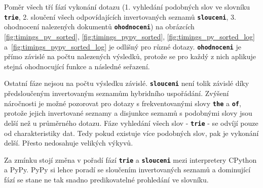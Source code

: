 \documentclass[11pt,letterpaper,oneside,openright]{book}
\newcommand{\bftt}[1]{\texttt{\textbf{#1}}}
\begin{document}
Poměr všech tří fází vykonání dotazu (1. vyhledání podobných slov ve slovníku
\bftt{trie}, 2. sloučení všech odpovídajících invertovaných seznamů
\bftt{slouceni}, 3. ohodnocení nalezených dokumentů \bftt{ohodnoceni}) na
obrázcích \ref{fig:timings_py_sorted}, \ref{fig:timings_pypy_sorted},
\ref{fig:timings_py_sorted_log} a~\ref{fig:timings_pypy_sorted_log} je odlišný
pro různé dotazy. \bftt{ohodnoceni} je přímo závislé na počtu nalezených
výsledků, protože se pro každý z nich aplikuje stejná ohodnocující funkce a
následné seřazení.

Ostatní fáze nejsou na počtu výsledku závislé. \bftt{slouceni} není tolik
závislé díky předsloučeným invertovaným seznamům hybridního uspořádání. Zvýšení
náročnosti je možné pozorovat pro dotazy s frekventovanými slovy \bftt{the} a
\bftt{of}, protože jejich invertované seznamy a disjunkce seznamů s podobnými
slovy jsou delší než u průměrného dotazu. Fáze vyhledání všech slov -
\bftt{trie} - se odvíjí pouze od charakteristiky dat. Tedy pokud existuje více
podobných slov, pak je vykonání delší. Přesto nedosahuje velikých výkyvů.

Za zmínku stojí změna v pořadí fází \bftt{trie} a \bftt{slouceni} mezi
interpretery CPython a PyPy. PyPy si lehce poradí se sloučením invertovaných
seznamů a dominující fází se stane ne tak snadno predikovatelné prohledání ve
slovníku.


\end{document}
